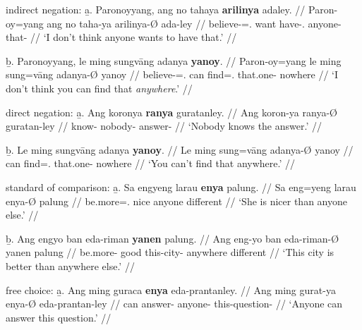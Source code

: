 \a indirect negation:\vspace{.5em} %
	\beginsubsub
	\b{a.} \begingl
		\gla Paronoyyang, ang no tahaya \textbf{arilinya} adaley. //
		\glb Paron-oy=yang ang no taha-ya arilinya-Ø ada-ley //
		\glc believe-\Neg{}=\Fsg{}.\Aarg{} \AgtT{} want 
			have-\Tsg{}.\M{} anyone-\Top{} that-\PargI{} //
		\glft `I don't think anyone wants to have that.' //
		\endgl\vspace{.5em}
	
	\b{b.} \begingl
		\gla Paronoyyang, le ming sungvāng adanya \textbf{yanoy}. //
		\glb Paron-oy=yang le ming sung=vāng adanya-Ø yanoy //
		\glc believe-\Neg{}=\Fsg{}.\Aarg{} \PatTI{} can 
			find=\Ssg{}.\Aarg{} that.one-\Top{} nowhere //
		\glft `I don't think you can find that \emph{anywhere}.' //
		\endgl
	\endsubsub

\a direct negation:\vspace{.5em} %
	\beginsubsub
	\b{a.} \begingl
		\gla Ang koronya \textbf{ranya} guratanley. //
		\glb Ang koron-ya ranya-Ø guratan-ley //
		\glc \AgtT{} know-\TsgM{} nobody-\Top{} answer-\PargI{} //
		\glft `Nobody knows the answer.' //
		\endgl\vspace{.5em}
		
	\b{b.} \begingl
		\gla Le ming sungvāng adanya \textbf{yanoy}. //
		\glb Le ming sung=vāng adanya-Ø yanoy //
		\glc \PatTI{} can find=\Ssg{}.\Aarg{} that.one-\Top{} nowhere //
		\glft `You can't find that anywhere.' //
		\endgl
	\endsubsub

\a standard of comparison:\vspace{.5em} %
	\beginsubsub
	\b{a.} \begingl
		\gla Sa engyeng larau \textbf{enya} palung. //
		\glb Sa eng=yeng larau enya-Ø palung //
		\glc \PatT{} be.more=\TsgF{}.\Aarg{} nice anyone different //
		\glft `She is nicer than anyone else.' //
		\endgl\vspace{.5em}
		
	\b{b.} \begingl
		\gla Ang engyo ban eda-riman \textbf{yanen} palung. //
		\glb Ang eng-yo ban eda-riman-Ø yanen palung //
		\glc \AgtT{} be.more-\TsgN{} good this-city-\Top{} anywhere 
			different //
		\glft `This city is better than anywhere else.' //
		\endgl
	\endsubsub

\a free choice:\vspace{.5em} %
	\beginsubsub
	\b{a.} \begingl
		\gla Ang ming guraca \textbf{enya} eda-prantanley. //
		\glb Ang ming gurat-ya enya-Ø eda-prantan-ley //
		\glc \AgtT{} can answer-\TsgM{} anyone-\Top{} 
				this-question-\PargI{} //
		\glft `Anyone can answer this question.' //
		\endgl\vspace{.5em}
		
